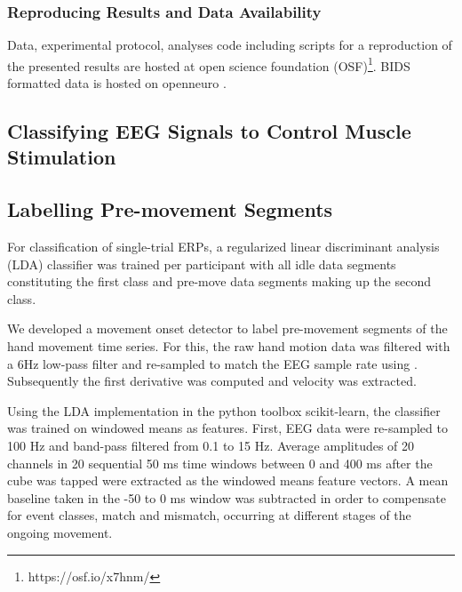 
\subsubsection{Reproducing Results and Data Availability}
 Data, experimental protocol, analyses code including scripts for a reproduction of the presented results are hosted at open science foundation  (OSF)\footnote{https://osf.io/x7hnm/}. BIDS formatted data is hosted on openneuro \cite{ds003846:1.0.0}.

\subsection{Classifying EEG Signals to Control Muscle Stimulation}


\subsection{Labelling Pre-movement Segments}
For classification of single-trial ERPs, a regularized linear discriminant analysis (LDA) classifier was trained per participant with all idle data segments constituting the first class and pre-move data segments making up the second class. 

We developed a movement onset detector to label pre-movement segments of the hand movement time series. For this, the raw hand motion data was filtered with a 6Hz low-pass filter and re-sampled to match the EEG sample rate using . Subsequently the first derivative was computed and velocity was extracted.

Using the LDA implementation in the python toolbox scikit-learn, the classifier was trained on windowed means as features. First, EEG data were re-sampled to 100 Hz and band-pass filtered from 0.1 to 15 Hz. Average amplitudes of 20 channels in 20 sequential 50 ms time windows between 0 and 400 ms after the cube was tapped were extracted as the windowed means feature vectors. A mean baseline taken in the -50 to 0 ms window was subtracted in order to compensate for event classes, match and mismatch, occurring at different stages of the ongoing movement. 

